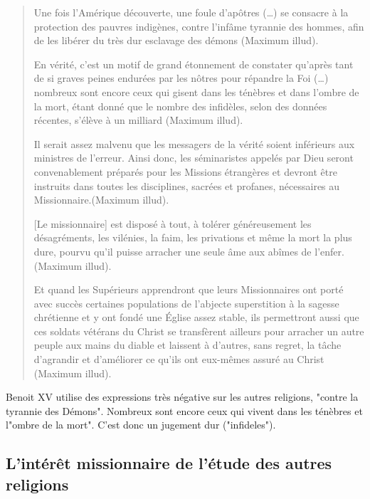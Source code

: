 \begin{quote}
    Une fois l’Amérique découverte, une foule d’apôtres (…) se consacre à la protection des pauvres
indigènes, contre l’infâme tyrannie des hommes, afin de les libérer du très dur esclavage des
démons (Maximum illud).

En vérité, c’est un motif de grand étonnement de constater qu’après tant de si graves peines
endurées par les nôtres pour répandre la Foi (…) nombreux sont encore ceux qui gisent dans les
ténèbres et dans l’ombre de la mort, étant donné que le nombre des infidèles, selon des données
récentes, s’élève à un milliard (Maximum illud).

Il serait assez malvenu que les messagers de la vérité soient inférieurs aux ministres de l’erreur.
Ainsi donc, les séminaristes appelés par Dieu seront convenablement préparés pour les Missions
étrangères et devront être instruits dans toutes les disciplines, sacrées et profanes, nécessaires au
Missionnaire.(Maximum illud).

[Le missionnaire] est disposé à tout, à tolérer généreusement les désagréments, les vilénies, la faim,
les privations et même la mort la plus dure, pourvu qu’il puisse arracher une seule âme aux abîmes
de l’enfer.(Maximum illud).

Et quand les Supérieurs apprendront que leurs Missionnaires ont porté avec succès certaines
populations de l’abjecte superstition à la sagesse chrétienne et y ont fondé une Église assez stable,
ils permettront aussi que ces soldats vétérans du Christ se transfèrent ailleurs pour arracher un autre
peuple aux mains du diable et laissent à d’autres, sans regret, la tâche d’agrandir et d’améliorer ce
qu’ils ont eux-mêmes assuré au Christ (Maximum illud). 
\end{quote}

Benoit XV utilise des expressions très négative sur les autres religions, "contre la tyrannie des Démons". Nombreux sont encore ceux qui vivent dans les ténèbres et l"ombre de la mort". C'est donc un jugement dur ("infideles"). 

\subsection{L’intérêt missionnaire de l’étude des autres religions}




